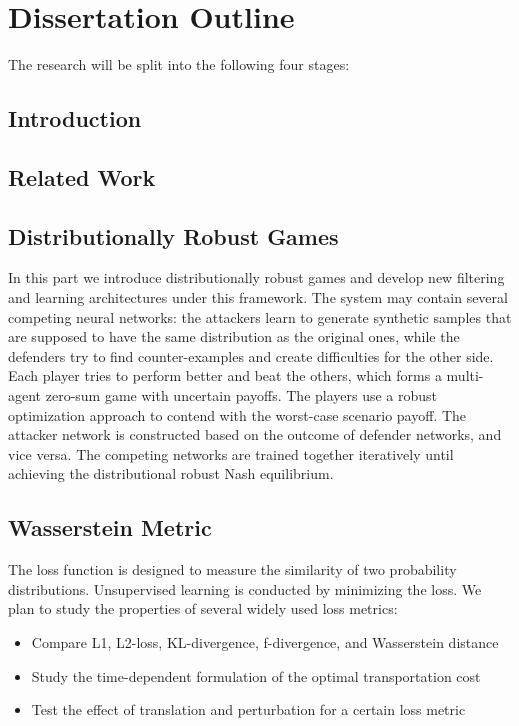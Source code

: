 \documentclass{article}
\begin{document}




\newpage



\section{Dissertation Outline}
\label{Sec:Outline}

The research will be split into the following four stages:

\subsection{Introduction}

\subsection{Related Work}

\subsection{Distributionally Robust Games}
In this part we introduce distributionally robust games and develop new filtering and learning architectures under this framework. The system may contain several competing neural networks: the attackers learn to generate synthetic samples that are supposed to have the same distribution as the original ones, while the defenders try to find counter-examples and create difficulties for the other side. Each player tries to perform better and beat the others, which forms a multi-agent zero-sum game with uncertain payoffs. The players use a robust optimization approach to contend with the worst-case scenario payoff. The attacker network is constructed based on the outcome of defender networks, and vice versa. The competing networks are trained together iteratively until achieving the distributional robust Nash equilibrium.

\subsection{Wasserstein Metric}
The loss function is designed to measure the similarity of two probability distributions. Unsupervised learning is conducted by minimizing the loss. We plan to study the properties of several widely used loss metrics:
\begin{itemize}
\item Compare L1, L2-loss, KL-divergence, f-divergence, and Wasserstein distance
\item Study the time-dependent formulation of the optimal transportation cost
\item Test the effect of translation and perturbation for a certain loss metric
\end{itemize}
\end{document}
